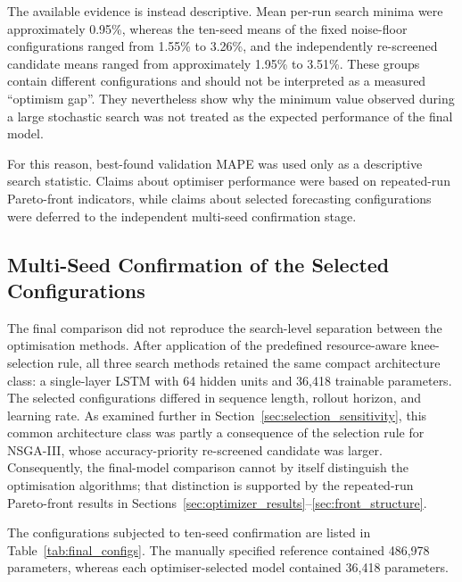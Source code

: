 \documentclass[a4paper,fleqn]{cas-sc}
\begin{document}
The available evidence is instead descriptive. Mean per-run search minima were approximately 0.95\%, whereas the ten-seed means of the fixed noise-floor configurations ranged from 1.55\% to 3.26\%, and the independently re-screened candidate means ranged from approximately 1.95\% to 3.51\%. These groups contain different configurations and should not be interpreted as a measured ``optimism gap''. They nevertheless show why the minimum value observed during a large stochastic search was not treated as the expected performance of the final model.

For this reason, best-found validation MAPE was used only as a descriptive search statistic. Claims about optimiser performance were based on repeated-run Pareto-front indicators, while claims about selected forecasting configurations were deferred to the independent multi-seed confirmation stage.


\subsection{Multi-Seed Confirmation of the Selected Configurations}
\label{sec:final_confirmation_results}

The final comparison did not reproduce the search-level separation between the optimisation methods. After application of the predefined resource-aware knee-selection rule, all three search methods retained the same compact architecture class: a single-layer LSTM with 64 hidden units and 36,418 trainable parameters. The selected configurations differed in sequence length, rollout horizon, and learning rate. As examined further in Section~\ref{sec:selection_sensitivity}, this common architecture class was partly a consequence of the selection rule for NSGA-III, whose accuracy-priority re-screened candidate was larger. Consequently, the final-model comparison cannot by itself distinguish the optimisation algorithms; that distinction is supported by the repeated-run Pareto-front results in Sections~\ref{sec:optimizer_results}--\ref{sec:front_structure}.

The configurations subjected to ten-seed confirmation are listed in Table~\ref{tab:final_configs}. The manually specified reference contained 486,978 parameters, whereas each optimiser-selected model contained 36,418 parameters.
\end{document}
